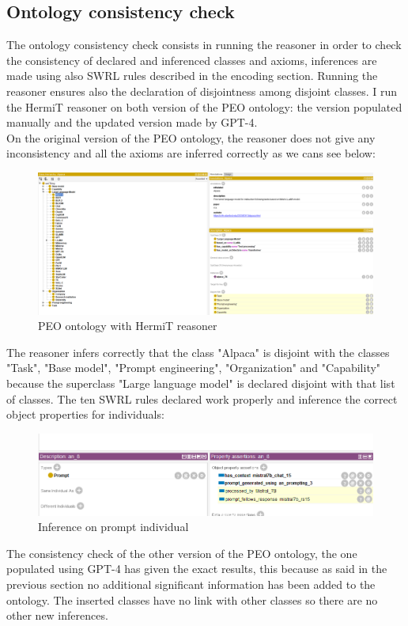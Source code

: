 \subsection{Ontology consistency check}
The ontology consistency check consists in running the reasoner in order to check the consistency of declared and inferenced classes and axioms, inferences are made using also SWRL rules described in the encoding section. Running the reasoner ensures also the declaration of disjointness among disjoint classes. I run the HermiT reasoner on both version of the PEO ontology: the version populated manually and the updated version made by GPT-4.\\
On the original version of the PEO ontology, the reasoner does not give any inconsistency and all the axioms are inferred correctly as we cans see below:
\begin{figure}[H]
    \centering
    \includegraphics[width=0.9\linewidth]{Figures/fig_39.png}
    \caption{PEO ontology with HermiT reasoner}
    \label{fig:enter-label}
\end{figure}
The reasoner infers correctly that the class "Alpaca" is disjoint with the classes "Task", "Base model", "Prompt engineering", "Organization" and "Capability" because the superclass "Large language model" is declared disjoint with that list of classes. The ten SWRL rules declared work properly and inference the correct object properties for individuals:
\begin{figure}[H]
    \centering
    \includegraphics[width=0.9\linewidth]{Figures/fig_40.png}
    \caption{Inference on prompt individual}
    \label{fig:enter-label}
\end{figure}
The consistency check of the other version of the PEO ontology, the one populated using GPT-4 has given the exact results, this because as said in the previous section no additional significant information has been added to the ontology. The inserted classes have no link with other classes so there are no other new inferences.

